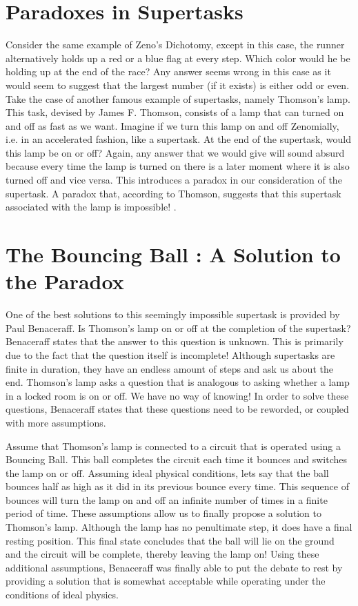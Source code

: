 \documentclass{article}
\begin{document}
\section{Paradoxes in Supertasks}
Consider the same example of Zeno’s Dichotomy, except in this case, the runner alternatively holds up a red or a blue flag at every step. Which color would he be holding up at the end of the race? Any answer seems wrong in this case as it would seem to suggest that the largest number (if it exists) is either odd or even. Take the case of another famous example of supertasks, namely Thomson’s lamp. This task, devised by James F. Thomson, consists of a lamp that can turned on and off as fast as we want. Imagine if we turn this lamp on and off Zenomially, i.e. in an accelerated fashion, like a supertask. At the end of the supertask, would this lamp be on or off? Again, any answer that we would give will sound absurd because every time the lamp is turned on there is a later moment where it is also turned off and vice versa. This introduces a paradox in our consideration of the supertask. A paradox that, according to Thomson, suggests that this supertask associated with the lamp is impossible! \cite{sep-spacetime-supertasks}.

\section{The Bouncing Ball : A Solution to the Paradox}
One of the best solutions to this seemingly impossible supertask is provided by Paul Benaceraff. Is Thomson's lamp on or off at the completion of the supertask? Benaceraff states that the answer to this question is unknown. This is primarily due to the fact that the question itself is incomplete!\cite{Benacerraf} Although supertasks are finite in duration, they have an endless amount of steps and ask us about the end. Thomson's lamp asks a question that is analogous to asking whether a lamp in a locked room is on or off. We have no way of knowing! In order to solve these questions, Benaceraff states that these questions need to be reworded, or coupled with more assumptions.\cite{Benacerraf}

\vspace{3mm}

Assume that Thomson's lamp is connected to a circuit that is operated using a Bouncing Ball. This ball completes the circuit each time it bounces and switches the lamp on or off. Assuming ideal physical conditions, lets say that the ball bounces half as high as it did in its previous bounce every time. This sequence of bounces will turn the lamp on and off an infinite number of times in a finite period of time. These assumptions allow us to finally propose a solution to Thomson's lamp. Although the lamp has no penultimate step, it does have a final resting position. This final state concludes that the ball will lie on the ground and the circuit will be complete, thereby leaving the lamp on!\cite{Earman-Norton} Using these additional assumptions, Benaceraff was finally able to put the debate to rest by providing a solution that is somewhat acceptable while operating under the conditions of ideal physics.
\end{document}
